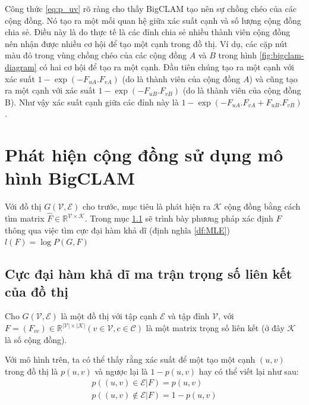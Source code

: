 Công thức \ref{eq:p_uv} rõ ràng cho thấy BigCLAM tạo nên sự chồng chéo của các cộng đồng. Nó tạo ra một mối quan hệ giữa xác suất cạnh và số lượng cộng đồng chia sẻ. Điều này là do thực tế là các đỉnh chia sẻ nhiều thành viên cộng đồng nên nhận được nhiều cơ hội để tạo một cạnh trong đồ thị. Ví dụ, các cặp nút màu đỏ trong vùng chồng chéo của các cộng đồng $A$ và $B$ trong hình \ref{fig:bigclam-diagram} có hai cơ hội để tạo ra một cạnh. Đầu tiên chúng tạo ra một cạnh với xác suất $1-\exp(-F_{uA}. F_{vA})$ (do là thành viên của cộng đồng $A$) và cũng tạo ra một cạnh với xác suất $1-\exp(-F_{uB}. F_{vB})$ (do là thành viên của cộng đồng B). Như vậy xác suất cạnh giữa các đỉnh này là $1-\exp(-F_{uA}. F_{vA}  + F_{uB}. F_{vB})$. 

\section {Phát hiện cộng đồng sử dụng mô hình BigCLAM}
Với đồ thị $G(\mathcal{V},\mathcal{E})$ cho trước, mục tiêu là phát hiện ra $\mathcal{K}$ cộng đồng bằng cách tìm matrix $\hat{F} \in \mathbb{R}^{\mathcal{V}\times \mathcal{K}}$. Trong mục \ref{df:dn-likelihood} sẽ trình bày phương pháp xác định $\hat{F}$ thông qua việc tìm cực đại hàm khả dĩ (định nghĩa \ref{df:MLE}) $l(F) = \log P(G,F)$ 

\subsection {Cực đại hàm khả dĩ ma trận trọng số liên kết của đồ thị}\label{df:dn-likelihood}
	
	Cho $G(\mathcal{V},\mathcal{E})$ là một đồ thị với tập cạnh $\mathcal{E}$ và tập đỉnh $\mathcal{V}$, với $F=(F_{vc})\in \mathbb{R}^{|\mathcal{V}|\times|\mathcal{K}|} (v \in \mathcal{V}, c \in \mathcal{C})$ là một matrix trọng số liên kết (ở đây $\mathcal{K}$ là số cộng đồng).
	
Với mô hình trên, ta có thể thấy rằng xác suất để một tạo một cạnh $(u,v)$ trong đồ thị là $p(u,v)$ và ngược lại là $1-p(u,v)$ hay có thể viết lại như sau:
\begin{eqnarray}
	p((u,v) \in \mathcal{E}|F) = p(u,v)\\
	p((u,v) \notin \mathcal{E}|F) = 1-p(u,v)
\end{eqnarray}

